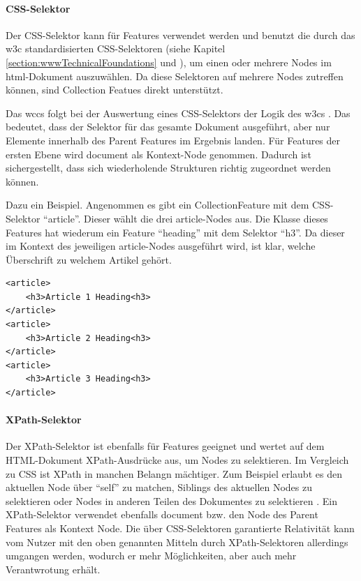         \paragraph{CSS-Selektor}
        Der CSS-Selektor kann für Features verwendet werden und benutzt
        die durch das \gls{w3c} standardisierten CSS-Selektoren
        (siehe Kapitel \ref{section:wwwTechnicalFoundations} und \cite{w3c:cssSelectors}),
        um einen oder mehrere Nodes im \gls{html}-Dokument auszuwählen.
        Da diese Selektoren auf mehrere Nodes zutreffen können,
        sind Collection Featues direkt unterstützt.

        Das \gls{wccs} folgt bei der Auswertung eines CSS-Selektors der Logik des \glspl{w3c}
        \cite{w3c:selectorsAPI}.
        Das bedeutet, dass der Selektor für das gesamte Dokument ausgeführt,
        aber nur Elemente innerhalb des Parent Features im Ergebnis landen.
        Für Features der ersten Ebene wird document als Kontext-Node genommen.
        Dadurch ist sichergestellt, dass sich wiederholende Strukturen richtig zugeordnet werden können.

        Dazu ein Beispiel. Angenommen es gibt ein CollectionFeature mit dem CSS-Selektor
        "`article"'. Dieser wählt die drei article-Nodes aus.
        Die Klasse dieses Features hat wiederum ein Feature "`heading"' mit dem Selektor
        "`h3"'.
        Da dieser im Kontext des jeweiligen article-Nodes ausgeführt wird,
        ist klar, welche Überschrift zu welchem Artikel gehört.

        \begin{lstlisting}
<article>
    <h3>Article 1 Heading<h3>
</article>
<article>
    <h3>Article 2 Heading<h3>
</article>
<article>
    <h3>Article 3 Heading<h3>
</article>
        \end{lstlisting}

        \paragraph{XPath-Selektor}
        Der XPath-Selektor ist ebenfalls für Features geeignet und wertet auf dem
        HTML-Dokument XPath-Ausdrücke aus, um Nodes zu selektieren.
        Im Vergleich zu CSS ist XPath in manchen Belangn mächtiger.
        Zum Beispiel erlaubt es den aktuellen Node über "`self"' zu matchen,
        Siblings des aktuellen Nodes zu selektieren
        oder Nodes in anderen Teilen des Dokumentes zu selektieren \cite{w3c:xpath}.
        Ein XPath-Selektor verwendet ebenfalls document bzw. den Node des Parent Features als
        Kontext Node.
        Die über CSS-Selektoren garantierte Relativität kann vom Nutzer mit den oben genannten Mitteln
        durch XPath-Selektoren allerdings umgangen werden,
        wodurch er mehr Möglichkeiten, aber auch mehr Verantwrotung erhält.

